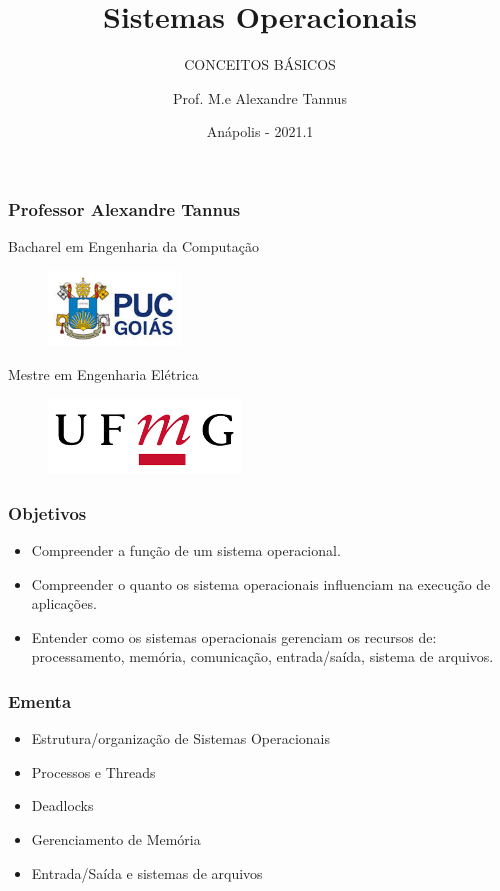 \documentclass[aspectratio=169,
				xcolor=table]{beamer}
\institute[]{\uppercase{Engenharia de Software}}
\title[]{Sistemas Operacionais}
\subtitle[]{\uppercase{Conceitos Básicos}}
\author[]{Prof. M.e Alexandre Tannus}
\date{Anápolis - 2021.1}
\begin{document}
	\begin{frame}
		\titlepage
	\end{frame}
	
	\begin{frame}
		\frametitle{Professor Alexandre Tannus}
		\begin{center}
			\centering
			\huge Bacharel em Engenharia da Computação
			\begin{figure}
				\centering
				\includegraphics[height=2cm, keepaspectratio]{../figs/puc.jpg} 			
			\end{figure}
			\huge Mestre em Engenharia Elétrica
			\begin{figure}
			\centering
				\includegraphics[height=2cm, keepaspectratio]{../figs/ufmg} 		
			\end{figure}
		\end{center}
	\end{frame}
	
	\begin{frame}
		\frametitle{Objetivos}
		\begin{itemize}
			\item Compreender a função de um sistema operacional.
			\vspace{1em}
			\item Compreender o quanto os sistema operacionais influenciam na execução de aplicações. 
			\vspace{1em}
			\item Entender como os sistemas operacionais gerenciam os recursos de: processamento, memória, comunicação, entrada/saída, sistema de arquivos.
		\end{itemize}
	\end{frame}



	\begin{frame}
		\frametitle{Ementa}
		\begin{itemize}
			\item Estrutura/organização de Sistemas Operacionais 
			\vspace{1em}
			\item Processos e Threads
			\vspace{1em}
			\item Deadlocks
			\vspace{1em}
			\item Gerenciamento de Memória
			\vspace{1em}
			\item Entrada/Saída e sistemas de arquivos
		\end{itemize}
	\end{frame}
\end{document}
